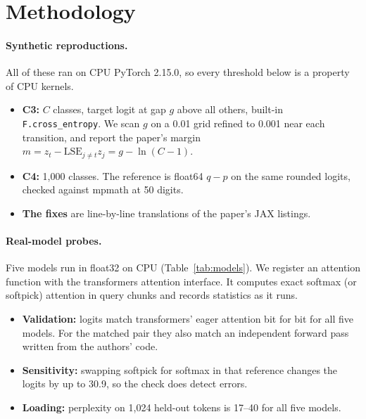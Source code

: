 \documentclass[10pt]{article}
\begin{document}
\section{Methodology}
\paragraph{Synthetic reproductions.} All of these ran on CPU PyTorch 2.15.0, so every threshold below is a property of CPU kernels.
\begin{itemize}[leftmargin=*,itemsep=1pt]
\item \textbf{C3:} $C$ classes, target logit at gap $g$ above all others, built-in \texttt{F.cross\_entropy}. We scan $g$ on a 0.01 grid refined to 0.001 near each transition, and report the paper's margin $m=z_t-\mathrm{LSE}_{j\neq t}z_j=g-\ln(C-1)$.
\item \textbf{C4:} 1,000 classes. The reference is float64 $q-p$ on the same rounded logits, checked against mpmath at 50 digits.
\item \textbf{The fixes} are line-by-line translations of the paper's JAX listings.
\end{itemize}

\paragraph{Real-model probes.} Five models run in float32 on CPU (Table~\ref{tab:models}). We register an attention function with the transformers attention interface. It computes exact softmax (or softpick) attention in query chunks and records statistics as it runs.
\begin{itemize}[leftmargin=*,itemsep=1pt]
\item \textbf{Validation:} logits match transformers' eager attention bit for bit for all five models. For the matched pair they also match an independent forward pass written from the authors' code.
\item \textbf{Sensitivity:} swapping softpick for softmax in that reference changes the logits by up to 30.9, so the check does detect errors.
\item \textbf{Loading:} perplexity on 1,024 held-out tokens is 17--40 for all five models.
\end{itemize}
\end{document}
